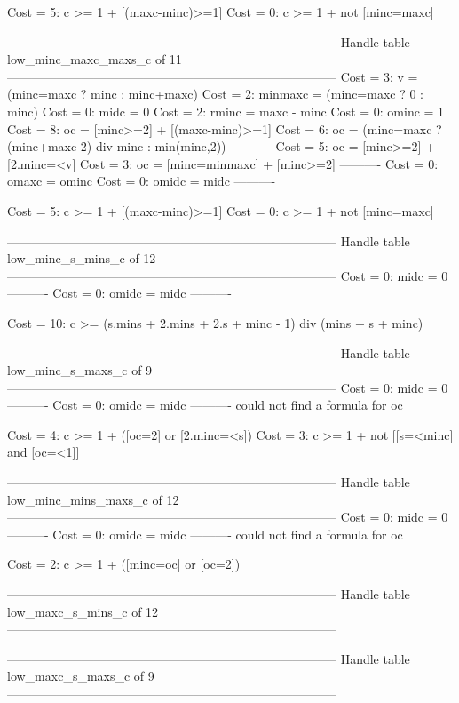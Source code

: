 Cost =  5:  c >= 1 + [(maxc-minc)>=1]
Cost =  0:  c >= 1 + not [minc=maxc]

--------------------------------------------------------------------------------
Handle table low_minc_maxc_maxs_c of 11
--------------------------------------------------------------------------------
Cost =  3:  v       = (minc=maxc ? minc : minc+maxc)
Cost =  2:  minmaxc = (minc=maxc ? 0 : minc)
Cost =  0:  midc    = 0
Cost =  2:  rminc   = maxc - minc
Cost =  0:  ominc   = 1
Cost =  8:  oc      = [minc>=2] + [(maxc-minc)>=1]
Cost =  6:  oc      = (minc=maxc ? (minc+maxc-2) div minc : min(minc,2))
----------
Cost =  5:  oc      = [minc>=2] + [2.minc=<v]
Cost =  3:  oc      = [minc=minmaxc] + [minc>=2]
----------
Cost =  0:  omaxc   = ominc
Cost =  0:  omidc   = midc
----------

Cost =  5:  c >= 1 + [(maxc-minc)>=1]
Cost =  0:  c >= 1 + not [minc=maxc]

--------------------------------------------------------------------------------
Handle table low_minc_s_mins_c of 12
--------------------------------------------------------------------------------
Cost =  0:  midc  = 0
----------
Cost =  0:  omidc = midc
----------

Cost = 10:  c >= (s.mins + 2.mins + 2.s + minc - 1) div (mins + s + minc)

--------------------------------------------------------------------------------
Handle table low_minc_s_maxs_c of 9
--------------------------------------------------------------------------------
Cost =  0:  midc  = 0
----------
Cost =  0:  omidc = midc
----------
could not find a formula for oc

Cost =  4:  c >= 1 + ([oc=2] or [2.minc=<s])
Cost =  3:  c >= 1 + not [[s=<minc] and [oc=<1]]

--------------------------------------------------------------------------------
Handle table low_minc_mins_maxs_c of 12
--------------------------------------------------------------------------------
Cost =  0:  midc  = 0
----------
Cost =  0:  omidc = midc
----------
could not find a formula for oc

Cost =  2:  c >= 1 + ([minc=oc] or [oc=2])

--------------------------------------------------------------------------------
Handle table low_maxc_s_mins_c of 12
--------------------------------------------------------------------------------


--------------------------------------------------------------------------------
Handle table low_maxc_s_maxs_c of 9
--------------------------------------------------------------------------------


